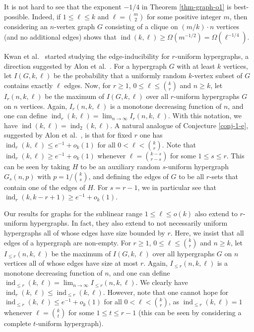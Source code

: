 \documentclass[11pt]{article}
\theoremstyle{definition}
\numberwithin{equation}{section}
\begin{document}
It is not hard to see that the exponent $-1/4$ in Theorem \ref{thm-graph-o1} is best-possible. Indeed, if $1\leq \ell\leq k$ and $\ell={m\choose 2}$ for some positive integer $m$, then considering an $n$-vertex graph $G$ consisting of a clique on $(m/k)\cdot n$ vertices (and no additional edges) shows that $\operatorname{ind}(k,\ell)\geq \Omega(m^{-1/2})=\Omega(\ell^{-1/4})$.

Kwan et al.\ \cite{kwan-et-al} started studying the edge-inducibility for $r$-uniform hypergraphs, a direction suggested by Alon et al.\ \cite{alon-et-al}. For a hypergraph $G$ with at least $k$ vertices, let $I(G,k,\ell)$ be the probability that a uniformly random $k$-vertex subset of $G$ contains exactly $\ell$ edges. Now, for $r\geq 1$, $0\leq \ell\leq {k\choose r}$ and $n\geq k$, let $I_r(n,k,\ell)$ be the maximum of $I(G,k,\ell)$ over all  $r$-uniform hypergraphs $G$ on $n$ vertices. Again, $I_r(n,k,\ell)$ is a monotone decreasing function of $n$, and one can define $\operatorname{ind}_r(k,\ell)=\lim_{n\to\infty} I_r(n,k,\ell)$. With this notation, we have $\operatorname{ind}(k,\ell)=\operatorname{ind}_2(k,\ell)$. A natural analogue of Conjecture \ref{conj-1-e}, suggested by Alon et al.\ \cite{alon-et-al}, is that for fixed $r$ one has $\operatorname{ind}_r(k,\ell)\leq e^{-1}+o_k(1)$ for all $0< \ell< {k\choose r}$. Note that $\operatorname{ind}_r(k,\ell)\geq e^{-1}+o_k(1)$ whenever $\ell={k-s\choose r-s}$ for some $1\leq s\leq r$. This can be seen by taking $H$ to be an auxiliary random $s$-uniform hypergraph $G_s(n,p)$ with $p=1/{k\choose s}$, and defining the edges of $G$ to be all $r$-sets that contain one of the edges of $H$. For $s=r-1$, we in particular see that $\operatorname{ind}_r(k,k-r+1)\geq e^{-1}+o_k(1)$.

Our results for graphs for the sublinear range $1\leq \ell\leq o(k)$ also extend to $r$-uniform hypergraphs. In fact, they also extend to not necessarily uniform hypergraphs all of whose edges have size bounded by $r$. Here, we insist that all edges of a hypergraph are non-empty. For $r\geq 1$, $0\leq \ell\leq {k\choose r}$ and $n\geq k$, let $I_{\leq r}(n,k,\ell)$ be the maximum of $I(G,k,\ell)$ over all hypergraphs $G$ on $n$ vertices all of whose edges have size at most $r$. Again, $I_{\leq r}(n,k,\ell)$ is a monotone decreasing function of $n$, and one can define $\operatorname{ind}_{\leq r}(k,\ell)=\lim_{n\to\infty} I_{\leq r}(n,k,\ell)$. We clearly have $\operatorname{ind}_r(k,\ell)\leq \operatorname{ind}_{\leq r}(k,\ell)$. However, note that one cannot hope for $\operatorname{ind}_{\leq r}(k,\ell)\leq e^{-1}+o_k(1)$ for all $0<\ell<{k\choose r}$, as $\operatorname{ind}_{\leq r}(k,\ell)=1$ whenever $\ell={k\choose t}$ for some $1\leq t\leq r-1$ (this can be seen by considering a complete $t$-uniform hypergraph).
\end{document}
